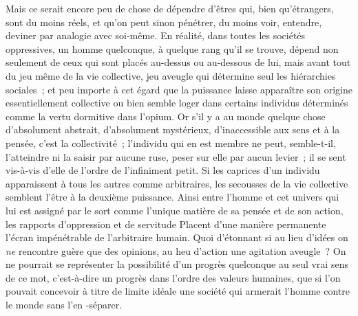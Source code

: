 \documentclass[french,twoside]{book} %
\begin{document}
Mais ce serait encore peu de chose de dépendre d'êtres qui, bien qu'étrangers, sont du moins réels, et qu'on peut sinon pénétrer, du moins voir, entendre, deviner par analogie avec soi-même. En réalité, dans toutes les sociétés oppressives, un homme quelconque, à quelque rang qu'il se trouve, dépend non seulement de ceux qui sont placés au-dessus ou au-dessous de lui, mais avant tout du jeu même de la vie collective, jeu aveugle qui détermine seul les hiérarchies sociales ; et peu importe à cet égard que la puissance laisse apparaître son origine essentiellement collective ou bien semble loger dans certains individus déterminés comme la vertu dormitive dans l'opium. Or s'il y a au monde quelque chose d'absolument abstrait, d'absolument mystérieux, d'inaccessible aux sens et à la pensée, c'est la collectivité ; l'individu qui en est membre ne peut, semble-t-il, l'atteindre ni la saisir par aucune ruse, peser sur elle par aucun levier ; il se sent vis-à-vis d'elle de l'ordre de l'infiniment petit. Si les caprices d'un individu apparaissent à tous les autres comme arbitraires, les secousses de la vie collective semblent l'être à la deuxième puissance. Ainsi entre l'homme et cet univers qui lui est assigné par le sort comme l'unique matière de sa pensée et de son action, les rapports d'oppression et de servitude Placent d'une manière permanente l'écran impénétrable de l'arbitraire humain. Quoi d'étonnant si au lieu d'idées on {\itshape ne} rencontre guère que des opinions, au heu d'action une agitation aveugle ? On ne pourrait se représenter la possibilité d'un progrès quelconque au seul vrai sens de ce mot, c'est-à-dire un progrès dans l'ordre des valeurs humaines, que si l'on pouvait concevoir à titre de limite idéale une société qui armerait l'homme contre le monde sans l'en -séparer.\par
\end{document}
